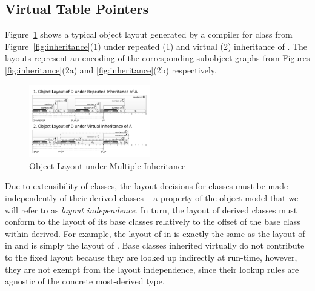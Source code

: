 \subsection{Virtual Table Pointers}
\label{sec:vtp}


Figure~\ref{fig:objlayout} shows a typical object layout generated by a \Cpp{} 
compiler for class  from Figure~\ref{fig:inheritance}(1) under repeated 
(1) and virtual (2) inheritance of . The layouts represent an encoding 
of the corresponding subobject graphs from Figures \ref{fig:inheritance}(2a) and 
\ref{fig:inheritance}(2b) respectively.

\begin{figure}[htbp]
  \centering
    \includegraphics[width=0.47\textwidth]{obj-layout.pdf}
  \caption{Object Layout under Multiple Inheritance}
  \label{fig:objlayout}
\end{figure}

Due to extensibility of classes, the layout decisions for classes must be 
made independently of their derived classes -- a property of the \Cpp{} object 
model that we will refer to as \emph{layout independence}. In turn, the layout of derived   
classes must conform to the layout of its base classes relatively to the offset 
of the base class within derived. For example, the layout of  in 
 is exactly the same as the layout of  in  and is simply
the layout of . Base classes inherited virtually do not contribute to 
the fixed layout because they are looked up indirectly at run-time, however, 
they are not exempt from the layout independence, since their lookup rules are 
agnostic of the concrete most-derived type.

